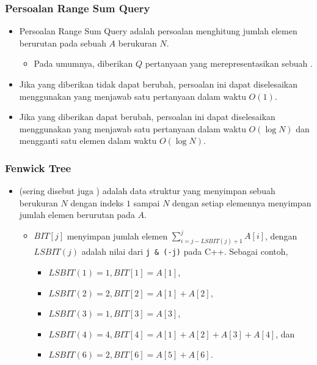 \begin{frame}
\frametitle{Persoalan Range Sum Query}
\begin{itemize}
  \item Persoalan Range Sum Query adalah persoalan menghitung jumlah elemen berurutan pada sebuah \farray $A$ berukuran $N$.
  \begin{itemize}
    \item Pada umumnya, diberikan $Q$ pertanyaan yang merepresentasikan sebuah \fsubarray.
  \end{itemize}
  \item Jika \farray yang diberikan tidak dapat berubah, persoalan ini dapat diselesaikan menggunakan \fprefixSum yang menjawab satu pertanyaan dalam waktu $O(1)$.
  \item Jika \farray yang diberikan dapat berubah, persoalan ini dapat diselesaikan menggunakan \ffenwickTree yang menjawab satu pertanyaan dalam waktu $O(\log N)$ dan mengganti satu elemen \farray dalam waktu $O(\log N)$.
\end{itemize}
\end{frame}

\begin{frame}
\frametitle{Fenwick Tree}
\begin{itemize}
  \item {} (sering disebut juga ) adalah data struktur yang menyimpan sebuah \farray berukuran $N$ dengan indeks $1$ sampai $N$ dengan setiap elemennya menyimpan jumlah elemen berurutan pada \farray $A$.
  \begin{itemize}
    \item $BIT[j]$ menyimpan jumlah elemen $\sum_{i=j - LSBIT(j) + 1}^{j} A[i]$, dengan $LSBIT(j)$ adalah nilai dari \lstinline{j & (-j)} pada C++. Sebagai contoh,
    \begin{itemize}
      \item $LSBIT(1) = 1, BIT[1] = A[1]$,
      \item $LSBIT(2) = 2, BIT[2] = A[1] + A[2]$,
      \item $LSBIT(3) = 1, BIT[3] = A[3]$,
      \item $LSBIT(4) = 4, BIT[4] = A[1] + A[2] + A[3] + A[4]$, dan
      \item $LSBIT(6) = 2, BIT[6] = A[5] + A[6]$.
    \end{itemize}
  \end{itemize}
\end{itemize}
\end{frame}

